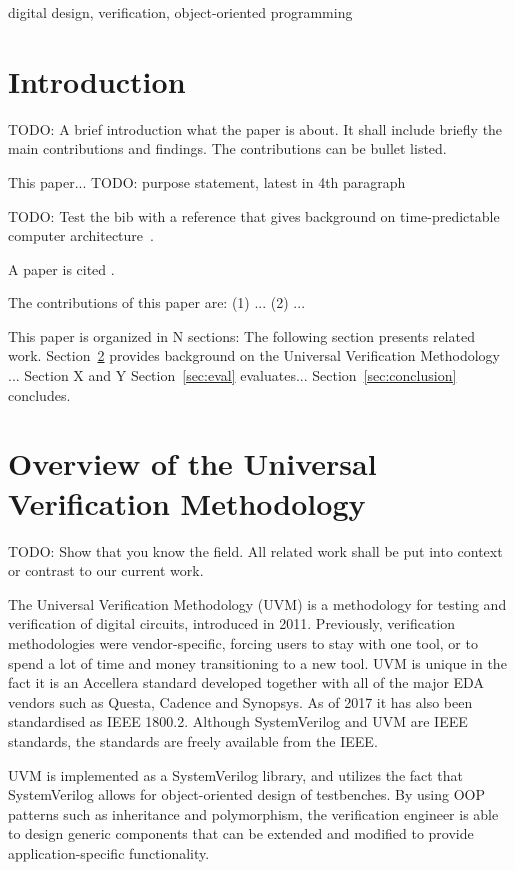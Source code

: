 \documentclass[a4paper, conference]{IEEEtran}
\newcommand{\todo}[1]{{\color{olive} TODO: #1}}
\begin{document}
\begin{IEEEkeywords}
digital design, verification, object-oriented programming
\end{IEEEkeywords}


\section{Introduction}
\label{sec:intro}

\todo{A brief introduction what the paper is about. It shall include briefly the
main contributions and findings. The contributions can be bullet listed.}

This paper... \todo{purpose statement, latest in 4th paragraph}

\todo{Test the bib with a reference that gives background on time-predictable
computer architecture~\cite{tpca:jes}.}

A paper is cited \cite{paper:example}.

The contributions of this paper are: (1) ... (2) ...

This paper is organized in N sections: The following section presents related work.
Section~\ref{sec:related} provides background on the Universal Verification Methodology ...
Section X and Y 
Section~\ref{sec:eval} evaluates...
Section~\ref{sec:conclusion} concludes.


\section{Overview of the Universal Verification Methodology}
\label{sec:related}

\todo{Show that you know the field. All related work shall be put
into context or contrast to our current work.}

The Universal Verification Methodology (UVM) is a methodology for testing and verification of digital circuits, introduced in 2011. Previously, verification methodologies were vendor-specific, forcing users to stay with one tool, or to spend a lot of time and money transitioning to a new tool. UVM is unique in the fact it is an Accellera standard developed together with all of the major EDA vendors such as Questa, Cadence and Synopsys. As of 2017 it has also been standardised as IEEE 1800.2. Although SystemVerilog and UVM are IEEE standards, the standards are freely available from the IEEE.

UVM is implemented as a SystemVerilog library, and utilizes the fact that SystemVerilog allows for object-oriented design of testbenches. By using OOP patterns such as inheritance and polymorphism, the verification engineer is able to design generic components that can be extended and modified to provide application-specific functionality. 
\end{document}
